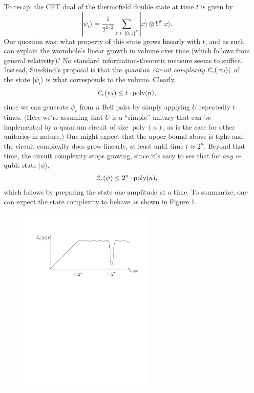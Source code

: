 \documentclass[12pt]{report}
\theoremstyle{plain}
\theoremstyle{definition}
\newcommand{\poly}{\operatorname{poly}}
\newcommand{\eps}{\varepsilon}
\renewcommand{\ket}[1]{|#1\rangle}
\begin{document}
To recap, the CFT dual of the thermofield double state at time $t$ is given by
\[
\ket{\psi_t} = \frac{1}{2^{n/2}} \sum_{x \in \{0,1\}^n} \ket{x} \otimes U^t \ket{x}.
\]
Our question was: what property of this state grows linearly with $t$, and as such can explain the wormhole's linear growth in volume over time (which follows from general relativity)? No standard information-theoretic measure seems to suffice. Instead, Susskind's proposal is that the \emph{quantum circuit complexity} ${\cal C}_{\eps}(\ket{\psi_t})$ of the state $\ket{\psi_t}$ is what corresponds to the volume.  Clearly,
\[
{\cal C}_\eps(\psi_t) \le t \cdot \poly(n),
\]
since we can generate $\psi_t$ from $n$ Bell pairs by simply applying $U$ repeatedly $t$ times. (Here we're assuming that $U$ is a ``simple'' unitary that can be implemented by a quantum circuit of size $\poly(n)$, as is the case for
other unitaries in nature.)  One might expect that the upper bound above is tight and the circuit complexity does grow linearly, at least until time $t\approx 2^n$. Beyond that time, the circuit complexity stops growing, since it's easy to see that for \emph{any} $n$-qubit state $\ket{\psi}$,
\[
{\cal C}_\eps(\psi) \le 2^{n} \cdot \poly(n),
\]
which follows by preparing the state one amplitude at a time.
To summarize, one can expect the state complexity to behave as shown in Figure \ref{complexitygraph}.

\begin{figure}[ht]
\label{complexitygraph}
\begin{center}
\includegraphics[width= 0.6\textwidth]{lec8_wormhole_plot}
\end{center}
\end{figure}
\end{document}
